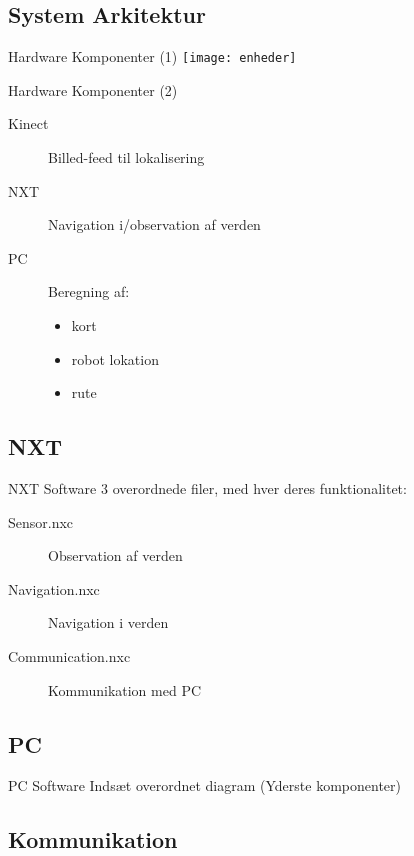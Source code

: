 \subsection{System Arkitektur}

\begin{frame}{Hardware Komponenter (1)}
\texttt{[image: enheder]}
\end{frame}

\begin{frame}{Hardware Komponenter (2)}
\begin{description}
\item[Kinect]{Billed-feed til lokalisering}
\item[NXT]{Navigation i/observation af verden}
\item[PC]{Beregning af:}
\begin{itemize}
\item{kort}
\item{robot lokation}
\item{rute}
\end{itemize}
\end{description}
\end{frame}

\subsection{NXT}

\begin{frame}{NXT Software}
3 overordnede filer, med hver deres funktionalitet:
\begin{description}
\item[Sensor.nxc]{Observation af verden}
\item[Navigation.nxc]{Navigation i verden}
\item[Communication.nxc]{Kommunikation med PC}
\end{description}
\end{frame}

\subsection{PC}

\begin{frame}{PC Software}
Indsæt overordnet diagram (Yderste komponenter)
\end{frame}

\subsection{Kommunikation}

